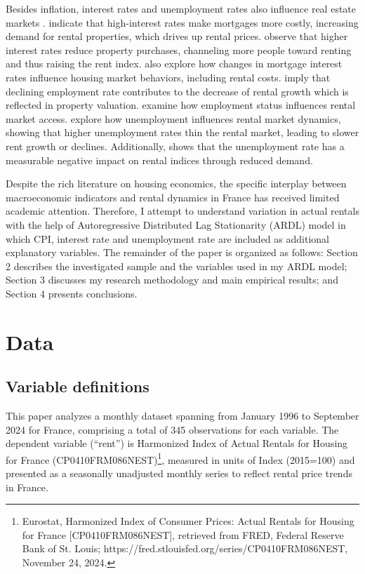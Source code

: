 \documentclass[12pt, times]{article}
\begin{document}
Besides inflation, interest rates and unemployment rates also influence real estate markets \citep{cucurachius}. \cite{case2000real} indicate that high-interest rates make mortgages more costly, increasing demand for rental properties, which drives up rental prices. \cite{hardin2012reit} observe that higher interest rates reduce property purchases, channeling more people toward renting and thus raising the rent index. \cite{lin2021house} also explore how changes in mortgage interest rates influence housing market behaviors, including rental costs. \cite{bouchouicha2012real} imply that declining employment rate contributes to the decrease of rental growth which is reflected in property valuation. \cite{carlsson2014discrimination} examine how employment status influences rental market access. \cite{gan2018market} explore how unemployment influences rental market dynamics, showing that higher unemployment rates thin the rental market, leading to slower rent growth or declines. Additionally, \cite{usta2021impact} shows that the unemployment rate has a measurable negative impact on rental indices through reduced demand. 

Despite the rich literature on housing economics, the specific interplay between macroeconomic indicators and rental dynamics in France has received limited academic attention. Therefore, I attempt to understand variation in actual rentals with the help of Autoregressive Distributed Lag Stationarity (ARDL) model in which CPI, interest rate and unemployment rate are included as additional explanatory variables. The remainder of the paper is organized as follows: Section 2 describes the investigated sample and the variables used in my ARDL model; Section 3 discusses my research methodology and main empirical results; and Section 4 presents conclusions.
\vspace{-1.5em}
\section{Data}
\vspace{-1.0em}
\subsection{Variable definitions}
This paper analyzes a monthly dataset spanning from January 1996 to September 2024 for France, comprising a total of 345 observations for each variable. The dependent variable (``rent'') is Harmonized Index of Actual Rentals for Housing for France (CP0410FRM086NEST)\footnote{Eurostat, Harmonized Index of Consumer Prices: Actual Rentals for Housing for France [CP0410FRM086NEST], retrieved from FRED, Federal Reserve Bank of St. Louis; https://fred.stlouisfed.org/series/CP0410FRM086NEST, November 24, 2024.}, measured in units of Index (2015=100) and presented as a seasonally unadjusted monthly series to reflect rental price trends in France. 
\end{document}
